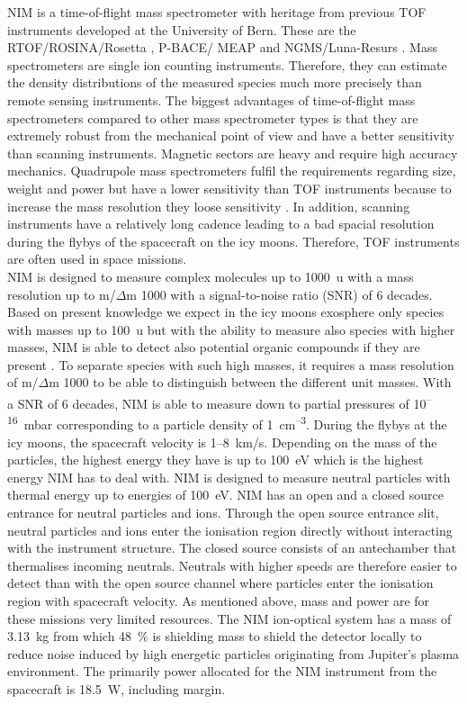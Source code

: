 	NIM is a time-of-flight mass spectrometer with heritage from previous TOF instruments developed at the University of Bern. These are the RTOF/ROSINA/Rosetta \cite{Balsiger2007a,Scherer2006}, P-BACE/ MEAP \cite{Abplanalp2009a} and NGMS/Luna-Resurs \cite{Wurz2012264,Fausch_IEEE}. Mass spectrometers are single ion counting instruments. Therefore, they can estimate the density distributions of the measured species much more precisely than remote sensing instruments. The biggest advantages of time-of-flight mass spectrometers compared to other mass spectrometer types is that they are extremely robust from the mechanical point of view and have a better sensitivity than scanning instruments. Magnetic sectors are heavy and require high accuracy mechanics. Quadrupole mass spectrometers fulfil the requirements regarding size, weight and power but have a lower sensitivity than TOF instruments because to increase the mass resolution they loose sensitivity \cite{Quadrupol_WorkPrinc}. In addition, scanning instruments have a relatively long cadence \cite{MassSpec_Overview} leading to a bad spacial resolution during the flybys of the spacecraft on the icy moons. Therefore, TOF instruments are often used in space missions.\\
	NIM is designed to measure complex molecules up to 1000~u with a mass resolution up to m/$\Delta$m 1000 with a signal-to-noise ratio (SNR) of 6 decades. Based on present knowledge we expect in the icy moons exosphere only species with masses up to 100~u but with the ability to measure also species with higher masses, NIM is able to detect also potential organic compounds if they are present \cite{NIM_Req_dMSNR}. To separate species with such high masses, it requires a mass resolution of m/$\Delta$m 1000 to be able to distinguish between the different unit masses. With a SNR of 6 decades, NIM is able to measure down to partial pressures of 10\textsuperscript{--16}~mbar corresponding to a particle density of 1~cm\textsuperscript{--3}. During the flybys at the icy moons, the spacecraft velocity is 1--8~km/s. Depending on the mass of the particles, the highest energy they have is up to 100~eV which is the highest energy NIM has to deal with. NIM is designed to measure neutral particles with thermal energy up to energies of 100~eV. NIM has an open and a closed source entrance for neutral particles and ions. Through the open source entrance slit, neutral particles and ions enter the ionisation region directly without interacting with the instrument structure. The closed source consists of an antechamber that thermalises incoming neutrals. Neutrals with higher speeds are therefore easier to detect than with the open source channel where particles enter the ionisation region with spacecraft velocity. As mentioned above, mass and power are for these missions very limited resources. The NIM ion-optical system has a mass of 3.13~kg from which 48~\% is shielding mass to shield the detector locally to reduce noise induced by high energetic particles originating from Jupiter's plasma environment. The primarily power allocated for the NIM instrument from the spacecraft is 18.5~W, including margin.

